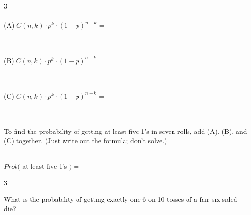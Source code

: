 \documentclass[a4paper,12pt]{book}
\newcounter{question}
\begin{document}
\begin{question}{\thequestion}{3}
            ~\\~\\
            (A) \tab $ C(n, k) \cdot p^{k} \cdot (1 - p)^{n-k} $ =
            
            ~\\~\\
            (B) \tab $ C(n, k) \cdot p^{k} \cdot (1 - p)^{n-k} $ =
            
            ~\\~\\
            (C) \tab $ C(n, k) \cdot p^{k} \cdot (1 - p)^{n-k} $ =

            ~\\~\\
            To find the probability of getting at least five 1's in seven rolls,
            add (A), (B), and (C) together. (Just write out the formula; don't solve.)

            ~\\
            $Prob($ at least five 1's $) = $
        \end{question}


        \newpage
        \begin{question}{\thequestion}{3}
            
            What is the probability of getting exactly one 6 on 10 tosses
            of a fair six-sided die?

            
        \end{question}
\end{document}
